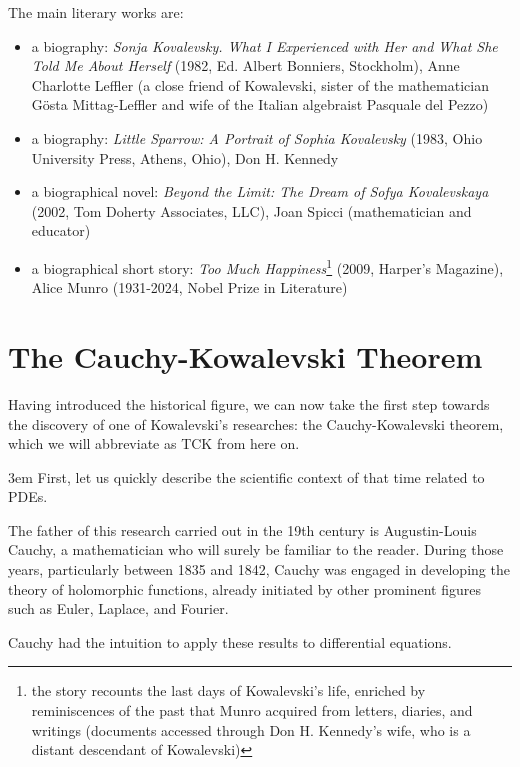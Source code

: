 The main literary works are:
\begin{itemize}

\item a biography: \textit{Sonja Kovalevsky. What I Experienced with Her and What She Told Me About Herself} (1982, Ed. Albert Bonniers, Stockholm), Anne Charlotte Leffler (a close friend of Kowalevski, sister of the mathematician Gösta Mittag-Leffler and wife of the Italian algebraist Pasquale del Pezzo)

\item a biography: \textit{Little Sparrow: A Portrait of Sophia Kovalevsky} (1983, Ohio University Press, Athens, Ohio), Don H. Kennedy

\item a biographical novel: \textit{Beyond the Limit: The Dream of Sofya Kovalevskaya} (2002, Tom Doherty Associates, LLC), Joan Spicci (mathematician and educator)

\item a biographical short story: \textit{Too Much Happiness}\footnote{the story recounts the last days of Kowalevski's life, enriched by reminiscences of the past that Munro acquired from letters, diaries, and writings (documents accessed through Don H. Kennedy's wife, who is a distant descendant of Kowalevski)}
(2009, Harper's Magazine), Alice Munro (1931-2024, Nobel Prize in Literature)

\end{itemize}

\section{The Cauchy-Kowalevski Theorem}

Having introduced the historical figure, we can now take the first step towards the discovery of one of Kowalevski's researches: the Cauchy-Kowalevski theorem, which we will abbreviate as TCK from here on.

\emergencystretch 3em
First, let us quickly describe the scientific context of that time related to PDEs.

The father of this research carried out in the 19th century is Augustin-Louis Cauchy, a mathematician who will surely be familiar to the reader. During those years, particularly between 1835 and 1842, Cauchy was engaged in developing the theory of holomorphic functions, already initiated by other prominent figures such as Euler, Laplace, and Fourier.

Cauchy had the intuition to apply these results to differential equations.


